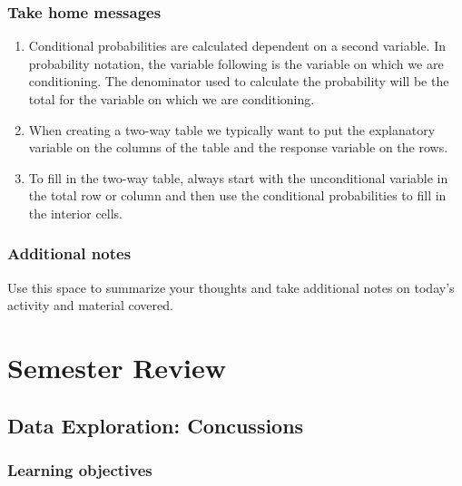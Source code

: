 \documentclass[
]{report}
\begin{document}
\newpage

\hypertarget{take-home-messages-20}{%
\subsection{Take home messages}\label{take-home-messages-20}}

\begin{enumerate}
\def\labelenumi{\arabic{enumi}.}
\item
  Conditional probabilities are calculated dependent on a second variable. In probability notation, the variable following \texttt{\textbar{}} is the variable on which we are conditioning. The denominator used to calculate the probability will be the total for the variable on which we are conditioning.
\item
  When creating a two-way table we typically want to put the explanatory variable on the columns of the table and the response variable on the rows.
\item
  To fill in the two-way table, always start with the unconditional variable in the total row or column and then use the conditional probabilities to fill in the interior cells.
\end{enumerate}

\hypertarget{additional-notes-20}{%
\subsection{Additional notes}\label{additional-notes-20}}

Use this space to summarize your thoughts and take additional notes on today's activity and material covered.

\newpage

\hypertarget{semester-review}{%
\chapter{Semester Review}\label{semester-review}}


\hypertarget{data-exploration-concussions}{%
\section{Data Exploration: Concussions}\label{data-exploration-concussions}}

\hypertarget{learning-objectives-20}{%
\subsection{Learning objectives}\label{learning-objectives-20}}
\end{document}
